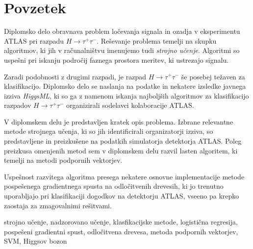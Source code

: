 \documentclass[11pt,a4paper,openany]{book}
\begin{document}




\setlength{\parindent}{0.7cm}
\setlength{\parskip}{0.1cm}


\chapter*{Povzetek}
\noindent Diplomsko delo obravnava problem ločevanja signala in ozadja v eksperimentu ATLAS pri razpadu $H \rightarrow \tau^+\tau^-$. Reševanje problema temelji na skupku algoritmov, ki jih v računalništvu imenujemo tudi \textit{strojno učenje}. Algoritmi so uspešni pri iskanju področij faznega prostora meritev, ki ustrezajo signalu.

Zaradi podobnosti z drugimi razpadi, je razpad $H \rightarrow \tau^+\tau^-$ še posebej težaven za klasifikacijo. Diplomsko delo se naslanja na podatke in nekatere izsledke javnega izziva \textit{HiggsML}, ki so ga z namenom iskanja najboljših algoritmov za klasifikacijo razpadov $H \rightarrow \tau^+\tau^-$ organizirali sodelavci kolaboracije ATLAS.

V diplomskem delu je predstavljen kratek opis problema. Izbrane relevantne metode strojnega učenja, ki so jih identificirali organizatorji izziva, so predstavljene in preizkušene na podatkih simulatorja detektorja ATLAS. Poleg preizkusa omenjenih metod sem v diplomskem delu razvil lasten algoritem, ki temelji na metodi podpornih vektorjev.

Uspešnost razvitega algoritma presega nekatere osnovne implementacije metode pospešenega gradientnega spusta na odločitvenih drevesih, ki jo trenutno uporabljajo pri klasifikaciji dogodkov na detektorju ATLAS, vseeno pa krepko zaostaja za zmagovalnimi rešitvami.


\vspace{1.3cm}


\vspace{0.1cm}
\noindent strojno učenje, nadzorovano učenje, klasfikacijske metode, logistična regresija, pospešeni gradientni spust, odločitvena drevesa, metoda podpornih vektorjev, SVM, Higgsov bozon
\end{document}
